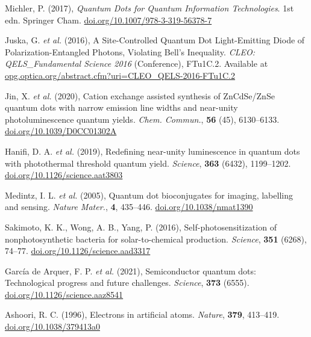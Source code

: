 \documentclass[12pt]{report}
\begin{document}
\begin{thebibliography}{10}

Michler, P. (2017), \textit{Quantum Dots for Quantum Information Technologies}. 1st edn. Springer Cham. \href{https://doi.org/10.1007/978-3-319-56378-7}{doi.org/10.1007/978-3-319-56378-7}

Juska, G. \textit{et al.} (2016), A Site-Controlled Quantum Dot Light-Emitting Diode of Polarization-Entangled Photons, Violating Bell's Inequality. \textit{CLEO: QELS\_Fundamental Science 2016} (Conference), FTu1C.2. Available at \href{https://opg.optica.org/abstract.cfm?uri=CLEO\_QELS-2016-FTu1C.2}{opg.optica.org/abstract.cfm?uri=CLEO\_QELS-2016-FTu1C.2}

Jin, X. \textit{et al.} (2020), Cation exchange assisted synthesis of ZnCdSe/ZnSe quantum dots with narrow emission line widths and near-unity photoluminescence quantum yields. \textit{Chem. Commun.}, \textbf{56} (45), 6130--6133. \href{https://doi.org/10.1039/D0CC01302A}{doi.org/10.1039/D0CC01302A}

Hanifi, D. A. \textit{et al.} (2019), Redefining near-unity luminescence in quantum dots with photothermal threshold quantum yield. \textit{Science}, \textbf{363} (6432), 1199--1202. \href{https://doi.org/10.1126/science.aat3803}{doi.org/10.1126/science.aat3803}

Medintz, I. L. \textit{et al.} (2005),
Quantum dot bioconjugates for imaging, labelling and sensing. \textit{Nature Mater.}, \textbf{4}, 435--446. \href{https://doi.org/10.1038/nmat1390}{doi.org/10.1038/nmat1390}

Sakimoto, K. K., Wong, A. B., Yang, P. (2016), Self-photosensitization
of nonphotosynthetic bacteria for solar-to-chemical production. \textit{Science}, \textbf{351} (6268), 74--77. \href{https://doi.org/10.1126/science.aad3317}{doi.org/10.1126/science.aad3317}

García de Arquer, F. P. \textit{et al.} (2021), Semiconductor quantum dots: Technological progress and future challenges. \textit{Science}, \textbf{373} (6555). \href{https://doi.org/10.1126/science.aaz8541}{doi.org/10.1126/science.aaz8541}

Ashoori, R. C. (1996), Electrons in artificial atoms. \textit{Nature}, \textbf{379}, 413--419. \href{https://doi.org/10.1038/379413a0}{doi.org/10.1038/379413a0}


\end{thebibliography}
\end{document}
